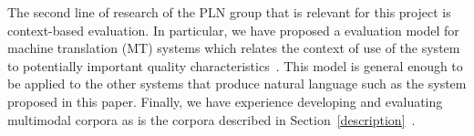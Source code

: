 
The second line of research of the PLN group that is relevant for this project
is context-based evaluation. In particular, we have proposed a evaluation model
for machine translation (MT) systems which relates the context of use of the
system to potentially important quality
characteristics~\cite{estr:impr08,estr:femt09}. This model is general enough to
be applied to the other systems that produce natural language such as the system
proposed in this paper. 
Finally, we have
experience developing and evaluating   
 multimodal corpora as is the corpora described in Section~\ref{description}~\cite{multieval}.



